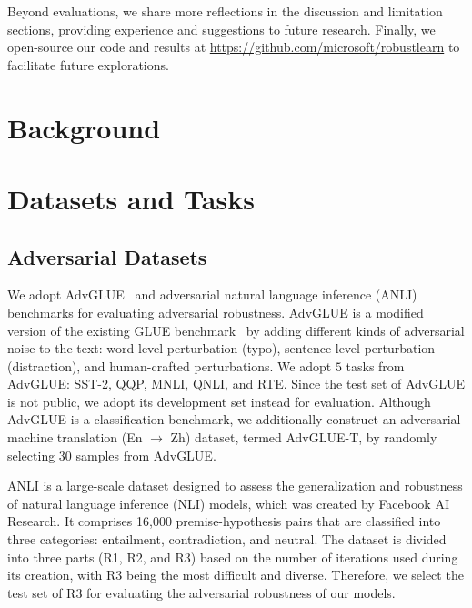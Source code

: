 \documentclass[11pt]{article}
\newcommand{\advglue}{AdvGLUE\xspace}
\begin{document}
Beyond evaluations, we share more reflections in the discussion and limitation sections, providing experience and suggestions to future research.
Finally, we open-source our code and results at \url{https://github.com/microsoft/robustlearn} to facilitate future explorations.


\section{Background}
\label{sec-back}



\section{Datasets and Tasks}
\label{sec-dataset}

\subsection{Adversarial Datasets}

We adopt \advglue~\cite{wang2021adversarial} and adversarial natural language inference (ANLI)~\cite{nie2019adversarial} benchmarks for evaluating adversarial robustness.
\advglue is a modified version of the existing GLUE benchmark~\cite{wang2019glue} by adding different kinds of adversarial noise to the text: word-level perturbation (typo), sentence-level perturbation (distraction), and human-crafted perturbations.
We adopt $5$ tasks from \advglue: SST-2, QQP, MNLI, QNLI, and RTE.
Since the test set of \advglue is not public, we adopt its development set instead for evaluation.
Although \advglue is a classification benchmark, we additionally construct an adversarial machine translation (En $\to$ Zh) dataset,  termed \advglue-T, by randomly selecting $30$ samples from \advglue. 

ANLI is a large-scale dataset designed to assess the generalization and robustness of natural language inference (NLI) models, which was created by Facebook AI Research. It comprises 16,000 premise-hypothesis pairs that are classified into three categories: entailment, contradiction, and neutral. The dataset is divided into three parts (R1, R2, and R3) based on the number of iterations used during its creation, with R3 being the most difficult and diverse.
Therefore, we select the test set of R3 for evaluating the adversarial robustness of our models.
\end{document}
